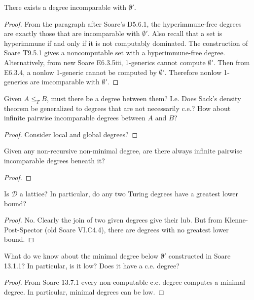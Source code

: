 \begin{theorem}
  There exists a degree incomparable with $\emptyset'$.
\end{theorem}
\begin{proof}
  From the paragraph after Soare's D5.6.1, the hyperimmune-free degrees
  are exactly those that are incomparable with $\emptyset'$. Also
  recall that a set is hyperimmune if and only if it is not computably
  dominated. The construction of Soare T9.5.1 gives a noncomputable set
  with a hyperimmune-free degree. \\

  Alternatively, from new Soare E6.3.5iii, 1-generics cannot compute
  $\emptyset'$. Then from E6.3.4, a nonlow 1-generic cannot be computed
  by $\emptyset'$. Therefore nonlow 1-generics are imcomparable with
  $\emptyset'$.
\end{proof}

\begin{question}
  Given $A\leq_T B$, must there be a degree between them? I.e. Does
  Sack's density theorem be generalized to degrees that are not
  necessarily c.e.? How about infinite pairwise incomparable degrees
  between $A$ and $B$?
\end{question}
\begin{proof}
  Consider local and global degrees?
\end{proof}

\begin{question}
  Given any non-recursive non-minimal degree, are there always infinite
  pairwise incomparable degrees beneath it?
\end{question}
\begin{proof}
\end{proof}

\begin{question}
  Is $\mathcal{D}$ a lattice? In particular, do any two Turing degrees
  have a greatest lower bound?
\end{question}
\begin{proof}
  No. Clearly the join of two given degrees give their lub. But from
  Klenne-Post-Spector (old Soare VI.C4.4), there are degrees with no
  greatest lower bound.
\end{proof}

\begin{question}
  What do we know about the minimal degree below $\emptyset'$
  constructed in Soare 13.1.1? In particular, is it low? Does it have a
  c.e. degree?
\end{question}
\begin{proof}
  From Soare 13.7.1 every non-computable c.e. degree computes a minimal
  degree. In particular, minimal degrees can be low.
\end{proof}

